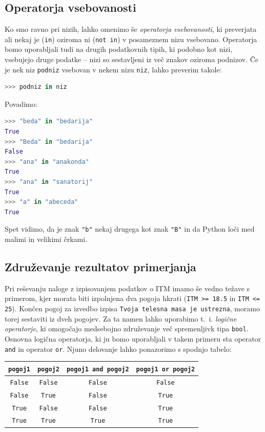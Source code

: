 \subsection{Operatorja vsebovanosti}

Ko smo ravno pri nizih, lahko omenimo še \emph{operatorja vsebovanosti}, ki preverjata ali nekaj je (\texttt{in}) oziroma ni (\texttt{not in}) v posameznem nizu vsebovano. Operatorja bomo uporabljali tudi na drugih podatkovnih tipih, ki podobno kot nizi, vsebujejo druge podatke -- nizi so sestavljeni iz več znakov oziroma podnizov. Če je nek niz \texttt{podniz} vsebovan v nekem nizu \texttt{niz}, lahko preverim takole:
\begin{lstlisting}[language=Python]
>>> podniz in niz
\end{lstlisting}
Povadimo:
\begin{lstlisting}[language=Python]
>>> "beda" in "bedarija"
True
>>> "Beda" in "bedarija"
False
>>> "ana" in "anakonda"
True
>>> "ana" in "sanatorij"
True
>>> "a" in "abeceda"
True
\end{lstlisting}
Spet vidimo, da je znak \texttt{"b"} nekaj drugega kot znak \texttt{"B"} in da Python loči med malimi in velikimi črkami.

\subsection{Združevanje rezultatov primerjanja}

Pri reševanju naloge z izpisovanjem podatkov o ITM imamo še vedno težave s primerom, kjer morata biti izpolnjena dva pogoja hkrati (\texttt{ITM >= 18.5} in \texttt{ITM <= 25}). Končen pogoj za izvedbo izpisa \texttt{Tvoja telesna masa je ustrezna}, moramo torej sestaviti iz dveh pogojev. Za ta namen lahko uporabimo t.~i. \emph{logične operatorje}, ki omogočajo medsebojno združevanje več spremenljivk tipa \texttt{bool}. Osnovna logična operatorja, ki ju bomo uporabljali v takem primeru sta operator \texttt{and} in operator \texttt{or}. Njuno delovanje lahko ponazorimo s spodnjo tabelo:

\begin{tabular}{cc|cc}
     \texttt{pogoj1} & \texttt{pogoj2}  & \texttt{pogoj1 and pogoj2} & \texttt{pogoj1 or pogoj2}\\
     \hline
     \texttt{False} & \texttt{False} & \texttt{False} & \texttt{False} \\
     \texttt{False} & \texttt{True} & \texttt{False} & \texttt{True} \\
     \texttt{True} & \texttt{False} & \texttt{False} & \texttt{True} \\
     \texttt{True} & \texttt{True} & \texttt{True} & \texttt{True} \\
\end{tabular}

